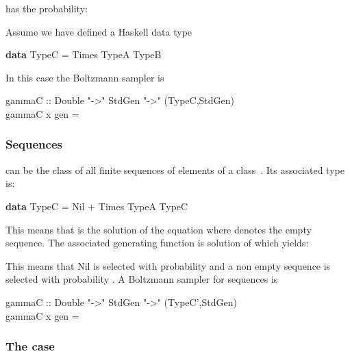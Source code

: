 \documentclass{sig-alternate}
\begin{document}
\begin{figure*}[!t]
 has the probability:

Assume we have defined a \textsf{Haskell} data type
\begin{haskell}
  \textbf{data} TypeC = Times TypeA TypeB
\end{haskell}
In this case the Boltzmann sampler is
\begin{haskell}
  \hspace*{-10pt} gammaC :: Double "->" StdGen "->" (TypeC,StdGen)\\
  \hspace*{-10pt} gammaC x gen = 
\end{haskell}

\subsubsection*{Sequences}
 
 can be the class of all finite sequences of elements of a class~. Its
associated type is:
\begin{haskell}
  \textbf{data} TypeC = Nil + Times TypeA TypeC
\end{haskell}
This means that  is the solution of the equation  where  denotes the empty sequence.  The associated generating
function is solution of  which yields:

This means that \<Nil\> is selected with probability  and a non empty
sequence is selected with probability .  
A Boltzmann sampler for sequences is
\begin{haskell}
  \hspace*{-20pt}gammaC  :: Double "->" StdGen "->" (TypeC',StdGen)\\
  \hspace*{-20pt}gammaC x gen = 
\end{haskell}

\subsubsection*{The case }


\end{figure*}
\end{document}
